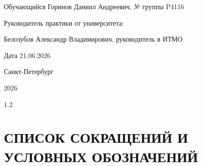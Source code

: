 \documentclass[a4paper,14pt]{extarticle}
\numberwithin{figure}{section}
\numberwithin{table}{section}
\begin{document}
\begin{titlepage}
\vspace{0.55cm}
\begin{flushleft}
Обучающийся Горинов Даниил Андреевич, № группы P4116\par
\vspace{0.25cm}
Руководитель практики от университета:\par
Белозубов Александр Владимирович, руководитель в ИТМО\par
\end{flushleft}

\vspace{0.35cm}
\begin{flushright}
Дата 21.06.2026\par
\end{flushright}

\vfill
\begin{center}
    {\normalsize Санкт-Петербург\par}
    {\normalsize 2026}
\end{center}
\end{titlepage}

\clearpage
\pagestyle{plain}
\setcounter{page}{2}

\begin{center}
\begin{spacing}{1.2}
    \tableofcontents
\end{spacing}
\end{center}

\clearpage

\section*{СПИСОК СОКРАЩЕНИЙ И УСЛОВНЫХ ОБОЗНАЧЕНИЙ}
{}
\label{sec:abbreviations}
\end{document}
